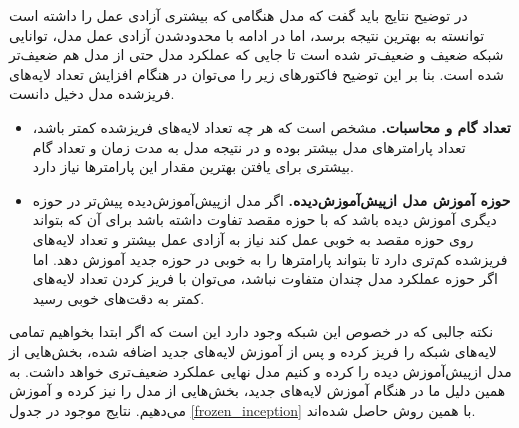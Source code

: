 \documentclass[12pt, a4paper]{article}
\begin{document}
در توضیح نتایج باید گفت که مدل هنگامی که بیشتری آزادی عمل را داشته است توانسته به بهترین نتیجه برسد،
اما در ادامه با محدودشدن آزادی عمل مدل، توانایی شبکه ضعیف و ضعیف‌تر شده است تا جایی که عملکرد مدل حتی
از مدل  هم ضعیف‌تر شده است. بنا بر این توضیح فاکتور‌های زیر را می‌توان در هنگام افزایش
تعداد لایه‌های فریزشده مدل دخیل دانست.

\begin{itemize}
    \item \textbf{تعداد گام و محاسبات.} مشخص است که هر چه تعداد لایه‌های فریزشده کمتر باشد،
    تعداد پارامتر‌های مدل بیشتر بوده و در نتیجه مدل به مدت زمان و تعداد گام بیشتری برای یافتن بهترین مقدار
    این پارامتر‌ها نیاز دارد.
    \item \textbf{حوزه آموزش مدل ازپیش‌آموزش‌دیده.} اگر مدل ازپیش‌آموزش‌دیده پیش‌تر در حوزه دیگری آموزش دیده باشد که با حوزه مقصد
    تفاوت داشته باشد برای آن که بتواند روی حوزه مقصد به خوبی عمل کند نیاز به آزادی عمل بیشتر و تعداد لایه‌های
    فریزشده کم‌تری دارد تا بتواند پارامتر‌ها را به خوبی در حوزه جدید آموزش دهد. اما اگر حوزه عملکرد مدل
    چندان متفاوت نباشد، می‌توان با فریز کردن تعداد لایه‌های کمتر به دقت‌های خوبی رسید.
\end{itemize}

نکته جالبی که در خصوص  این شبکه وجود دارد این است که اگر ابتدا بخواهیم تمامی لایه‌های شبکه 
را فریز کرده و پس از آموزش لایه‌های جدید اضافه شده، بخش‌هایی از مدل ازپیش‌آموزش دیده را  کرده و 
کنیم مدل نهایی عملکرد ضعیف‌تری خواهد داشت. به همین دلیل ما در هنگام آموزش لایه‌های جدید، بخش‌هایی از مدل 
را نیز  کرده و آموزش می‌دهیم. نتایج موجود در جدول \ref{frozen_inception} با همین روش حاصل شده‌اند.
\end{document}
